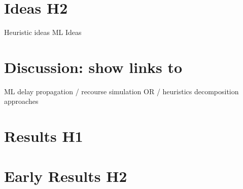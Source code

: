 \documentclass{article}
\begin{document}
\section{Ideas H2}
        Heuristic ideas
        ML Ideas
\section{Discussion: show links to}
        ML
        delay propagation / recourse
        simulation
        OR / heuristics
        decomposition approaches
\section{Results H1}
\section{Early Results H2}





\end{document}
